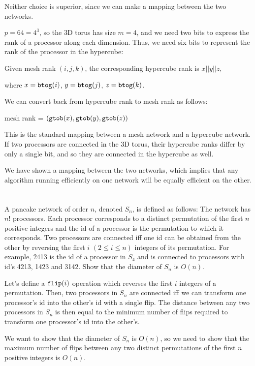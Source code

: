 \documentclass{article}
\begin{document}
\quad Neither choice is superior, since we can make a mapping between the two networks.

$p = 64 = 4^3$, so the 3D torus has size $m=4$, and we need two bits to express the rank of a processor along each dimension.
Thus, we need six bits to represent the rank of the processor in the hypercube:

Given mesh rank $(i, j, k)$, the corresponding hypercube rank is $x || y || z$,

where $x = \verb|btog|(i)$, $y = \verb|btog|(j)$, $z = \verb|btog|(k)$.

We can convert back from hypercube rank to mesh rank as follows:

mesh rank = $(\verb|gtob|(x), \verb|gtob|(y), \verb|gtob|(z))$

This is the standard mapping between a mesh network and a hypercube network.
If two processors are connected in the 3D torus, their hypercube ranks differ by only a single bit, and so they are connected in the hypercube as well.

We have shown a mapping between the two networks, which implies that any algorithm running efficiently on one network will be equally efficient on the other.

\section{}
A pancake network of order $n$, denoted $S_n$, is defined as follows:
The network has $n!$ processors.
Each processor corresponds to a distinct permutation of the first $n$ positive integers and the id of a processor is the permutation to which it corresponds.
Two processors are connected iff one id can be obtained from the other by reversing the first $i$ $(2 \leq i \leq n)$ integers of its permutation.
For example, 2413 is the id of a processor in $S_4$ and is connected to processors with id's 4213, 1423 and 3142.
Show that the diameter of $S_n$ is $O(n)$.

\quad Let's define a $\verb|flip|(i)$ operation which reverses the first $i$ integers of a permutation.
Then, two processors in $S_n$ are connected iff we can transform one processor's id into the other's id with a single flip.
The distance between any two processors in $S_n$ is then equal to the minimum number of flips required to transform one processor's id into the other's.

We want to show that the diameter of $S_n$ is $O(n)$, so we need to show that the maximum number of flips between any two distinct permutations of the first $n$ positive integers is $O(n)$.
\end{document}
